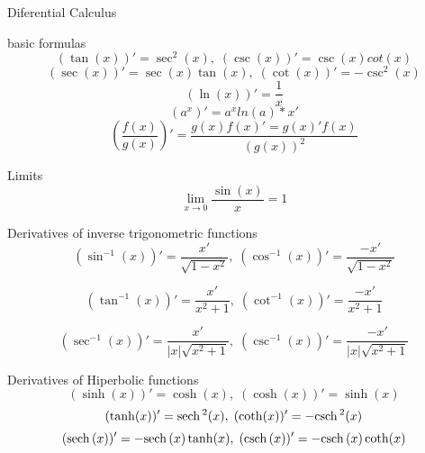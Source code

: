 \newpage
\begin{section}{Diferential Calculus}

	\begin{subsection}{basic formulas}
		$$(\tan(x))' = \sec ^2(x),\; (\csc (x))' = \csc(x)cot(x)$$
		$$(\sec (x))' = \sec (x) \tan (x) ,\; (\cot (x))' = -\csc^2 (x)$$
		$$(\ln (x))' = \frac{1}{x}$$
		$$(a^{x})' = a^{x}ln(a)*x'$$
		$$(\frac{f(x)}{g(x)})' = \frac{g(x)f(x)' = g(x)'f(x)}{(g(x))^2}$$
	
	\end{subsection}
	\begin{subsection}{Limits}
		$$\lim_{x \rightarrow 0} \frac{\sin(x)}{x} = 1$$
	
	\end{subsection}
	\begin{subsection}{Derivatives of inverse trigonometric functions}
		$$(\sin^{-1} (x))' = \frac{x'}{\sqrt{1-x^2}},\;
		(\cos^{-1} (x))'= \frac{-x'}{\sqrt{1-x^2}}$$

		$$(\tan^{-1} (x))'= \frac{x'}{x^2 + 1},\;
		(\cot^{-1} (x))'= \frac{-x'}{x^2 + 1}$$

		$$(\sec^{-1} (x))'= \frac{x'}{\vert x \vert \sqrt{x^2 + 1} },\;
		(\csc^{-1} (x))'= \frac{-x'}{\vert x \vert \sqrt{x^2 + 1} }$$
	\end{subsection}
	\begin{subsection}{Derivatives of Hiperbolic functions}
		$$(\sinh (x) )' = \cosh (x) , \; (\cosh (x))' = \sinh (x) $$
		$$(\tanh (x) )' = \mathrm{sech} \,^2 (x) , \; (\coth (x))' = -\mathrm{csch} \,^2 (x) $$
		$$(\mathrm{sech} \, (x) )' = -\mathrm{sech} \, (x) \tanh(x), \; (\mathrm{csch} \, (x))' = -\mathrm{csch} \, (x) \coth (x) $$
	\end{subsection}
	

\end{section}
